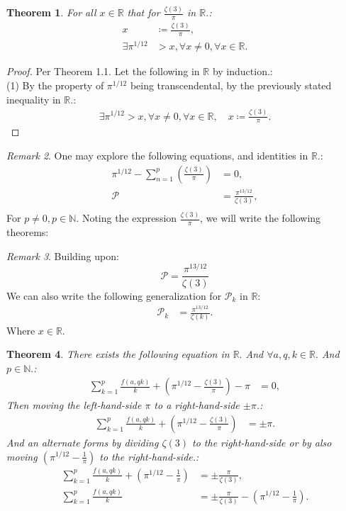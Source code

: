 \documentclass[10pt]{article}
\theoremstyle{plain}
\newtheorem{theorem}{Theorem}[section]
\theoremstyle{definition}
\theoremstyle{remark}
\newtheorem{remark}[theorem]{Remark}
\begin{document}
\begin{theorem}
For all $x \in \mathbb{R}$ that for $\frac{\zeta(3)}{\pi}$ in $\mathbb{R}$.:
\begin{align*}
	x &\coloneq \frac{\zeta(3)}{\pi},\\
	\exists \pi^{1/12} &> x, \forall x \neq 0, \forall x \in \mathbb{R}.
\end{align*}
\end{theorem}
\begin{proof}
Per Theorem 1.1. Let the following in $\mathbb{R}$ by induction.:\\(1) By the property of $\pi^{1/12}$ being transcendental, by the previously stated inequality in $\mathbb{R}.$:
\begin{align*}
		\exists \pi^{1/12} > x, \forall x \neq 0, \forall x \in \mathbb{R}, \quad x \coloneq \frac{\zeta(3)}{\pi}.
\end{align*}
\end{proof}
\begin{remark}
	One may explore the following equations, and identities in $\mathbb{R}.$:
	\begin{align*}
		\pi^{1/12} - \sum_{n=1}^{p}(\frac{\zeta(3)}{\pi}) &= 0,\\
		\mathcal{P} &= \frac{\pi^{13/12}}{\zeta(3)},\\
	\end{align*}
	For $p \neq 0, p \in \mathbb{N}$. Noting the expression $\frac{\zeta(3)}{\pi}$, we will write the following theorems:
\end{remark}
\begin{remark}
	Building upon:
	\begin{equation}
		\mathcal{P} = \frac{\pi^{13/12}}{\zeta(3)}
	\end{equation}
	We can also write the following generalization for $\mathcal{P}_k$ in $\mathbb{R}$:
	\begin{align*}
		\mathcal{P}_k &= \frac{\pi^{13/12}}{\zeta(k)}.
	\end{align*}
	Where $x \in \mathbb{R}$.
\end{remark}
\begin{theorem}
There exists the following equation in $\mathbb{R}.$ And $\forall a, q, k \in \mathbb{R}.$ And $p \in \mathbb{N}.$:
\begin{align*}
	\sum_{k=1}^{p} \frac{f(a, qk)}{k} + (\pi^{1/12} - \frac{\zeta(3)}{\pi}) - \pi &= 0,
\end{align*}
Then moving the left-hand-side $\pi$ to a right-hand-side $\pm \pi$.:
\begin{align*}
	\sum_{k=1}^{p} \frac{f(a, qk)}{k} + (\pi^{1/12} - \frac{\zeta(3)}{\pi}) &= \pm \pi.
\end{align*}
And an alternate forms by dividing $\zeta(3)$ to the right-hand-side or by also moving $(\pi^{1/12} - \frac{1}{\pi})$ to the right-hand-side.:
\begin{align*}
	\sum_{k=1}^{p} \frac{f(a, qk)}{k} + (\pi^{1/12} - \frac{1}{\pi}) &= \pm \frac{\pi}{\zeta(3)},\\
	\sum_{k=1}^{p} \frac{f(a, qk)}{k} &= \pm \frac{\pi}{\zeta(3)} - (\pi^{1/12} - \frac{1}{\pi}) .
\end{align*}
\end{theorem}
\end{document}
